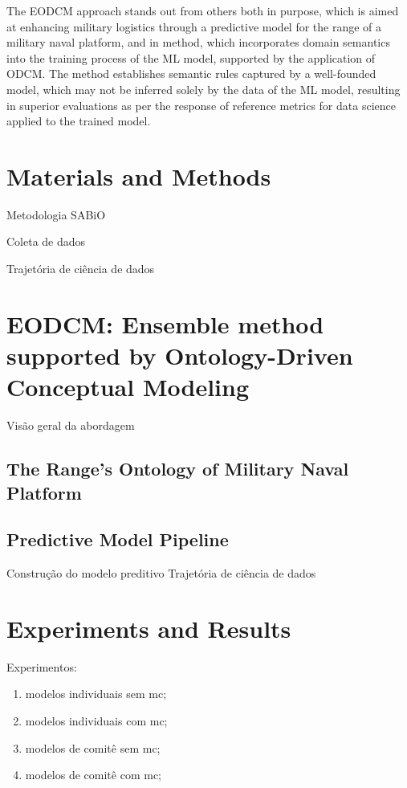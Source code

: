 \documentclass[
]{ceurart}
\begin{document}
\par The EODCM approach stands out from others both in purpose, which is aimed at enhancing military logistics through a predictive model for the range of a military naval platform, and in method, which incorporates domain semantics into the training process of the ML model, supported by the application of ODCM. The method establishes semantic rules captured by a well-founded model, which may not be inferred solely by the data of the ML model, resulting in superior evaluations as per the response of reference metrics for data science applied to the trained model.


\section{Materials and Methods}

Metodologia SABiO

Coleta de dados

Trajetória de ciência de dados


\section{EODCM: Ensemble method supported by Ontology-Driven Conceptual Modeling}

Visão geral da abordagem

\subsection{The Range's Ontology of Military Naval Platform}

\subsection{Predictive Model Pipeline}
Construção do modelo preditivo
Trajetória de ciência de dados


\section{Experiments and Results}

Experimentos:
\begin{enumerate}
\item modelos individuais sem mc;
\item modelos individuais com mc;
\item modelos de comitê sem mc;
\item modelos de comitê com mc;
\end{enumerate}
\end{document}

